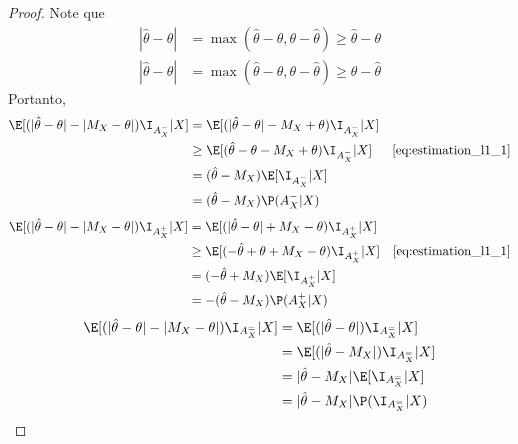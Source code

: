 \begin{proof}
 Note que
 \begin{align}
  \label{eq:estimation_l1_1}
  |\hat{\theta}-\theta| 
  &= \max(\hat{\theta}-\theta,\theta-\hat{\theta})
  \geq \hat{\theta}-\theta \nonumber \\
  |\hat{\theta}-\theta| 
  &= \max(\hat{\theta}-\theta,\theta-\hat{\theta})
  \geq \theta-\hat{\theta}
 \end{align}
 Portanto,
 \begin{align*}
  \E[(|\hat{\theta}-\theta|-|M_{X}-\theta|)\I_{A^{-}_X}|X]
  &=\E[(|\hat{\theta}-\theta|-M_{X}+\theta)\I_{A^{-}_X}|X]\\
  &\geq \E[(\hat{\theta}-\theta-M_{X}+\theta)\I_{A^{-}_X}|X]
  & \text{\cref{eq:estimation_l1_1}} \\
  &= (\hat{\theta}-M_{X})\E[\I_{A^{-}_X}|X] \\
  &= (\hat{\theta}-M_{X})\P(A^{-}_X|X)
 \end{align*}
 \begin{align*}
  \E[(|\hat{\theta}-\theta|-|M_{X}-\theta|)\I_{A^{+}_X}|X]
  &=\E[(|\hat{\theta}-\theta|+M_{X}-\theta)\I_{A^{+}_X}|X]\\
  &\geq \E[(-\hat{\theta}+\theta
  +M_{X}-\theta)\I_{A^{+}_X}|X]
  & \text{\cref{eq:estimation_l1_1}} \\
  &= (-\hat{\theta}+M_{X})\E[\I_{A^{+}_X}|X] \\
  &= -(\hat{\theta}-M_{X})\P(A^{+}_X|X)
 \end{align*}
 \begin{align*}
  \E[(|\hat{\theta}-\theta|-|M_{X}-\theta|)\I_{A^{=}_X}|X]
  &=\E[(|\hat{\theta}-\theta|)\I_{A^{=}_X}|X]\\
  &=\E[(|\hat{\theta}-M_{X}|)\I_{A^{=}_X}|X]\\
  &= |\hat{\theta}-M_{X}|\E[\I_{A^{=}_X}|X]\\
  &=|\hat{\theta}-M_{X}|\P(\I_{A^{=}_X}|X)
 \end{align*}
\end{proof}

